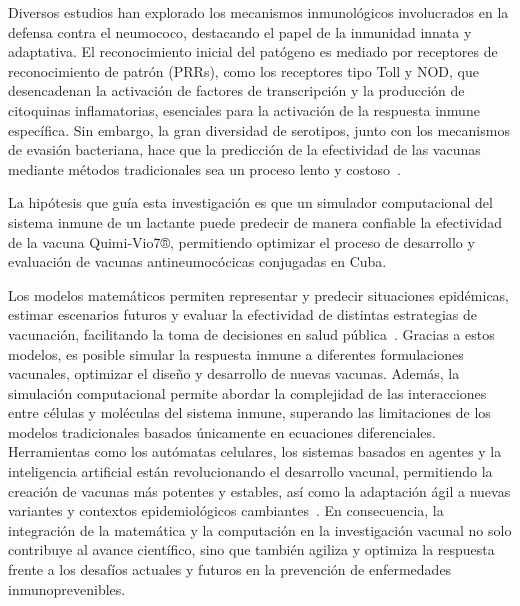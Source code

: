 Diversos estudios han explorado los mecanismos inmunológicos involucrados en la defensa contra el neumococo, destacando el papel de la inmunidad innata y adaptativa. El reconocimiento inicial del patógeno es mediado por receptores de reconocimiento de patrón (PRRs), como los receptores tipo Toll y NOD, que desencadenan la activación de factores de transcripción y la producción de citoquinas inflamatorias, esenciales para la activación de la respuesta inmune específica. Sin embargo, la gran diversidad de serotipos, junto con los mecanismos de evasión bacteriana, hace que la predicción de la efectividad de las vacunas mediante métodos tradicionales sea un proceso lento y costoso~\cite{Janeway2002}.



La hipótesis que guía esta investigación es que un simulador computacional del sistema inmune de un lactante puede predecir de manera confiable la efectividad de la vacuna Quimi-Vio7®, permitiendo optimizar el proceso de desarrollo y evaluación de vacunas antineumocócicas conjugadas en Cuba.


Los modelos matemáticos permiten representar y predecir situaciones epidémicas, estimar escenarios futuros y evaluar la efectividad de distintas estrategias de vacunación, facilitando la toma de decisiones en salud pública~\cite{UC3M2022}. Gracias a estos modelos, es posible simular la respuesta inmune a diferentes formulaciones vacunales, optimizar el diseño y desarrollo de nuevas vacunas. Además, la simulación computacional permite abordar la complejidad de las interacciones entre células y moléculas del sistema inmune, superando las limitaciones de los modelos tradicionales basados únicamente en ecuaciones diferenciales. Herramientas como los autómatas celulares, los sistemas basados en agentes y la inteligencia artificial están revolucionando el desarrollo vacunal, permitiendo la creación de vacunas más potentes y estables, así como la adaptación ágil a nuevas variantes y contextos epidemiológicos cambiantes~\cite{DW2023}. En consecuencia, la integración de la matemática y la computación en la investigación vacunal no solo contribuye al avance científico, sino que también agiliza y optimiza la respuesta frente a los desafíos actuales y futuros en la prevención de enfermedades inmunoprevenibles.

